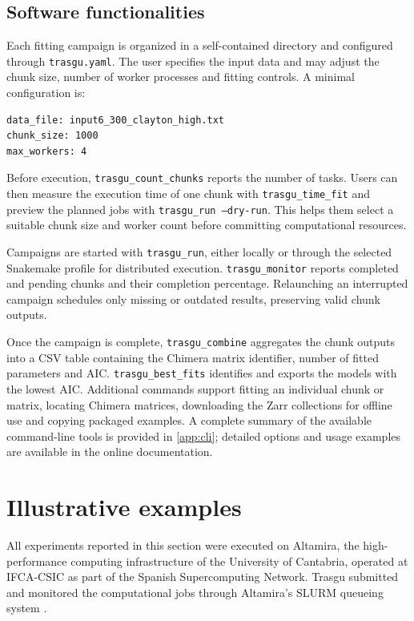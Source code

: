 \documentclass[preprint,12pt, a4paper]{elsarticle}
\begin{document}
\subsection{Software functionalities}

Each fitting campaign is organized in a self-contained directory and configured
through \texttt{trasgu.yaml}. The user specifies the input data and may adjust
the chunk size, number of worker processes and fitting controls. A minimal
configuration is:

\begin{verbatim}
data_file: input6_300_clayton_high.txt
chunk_size: 1000
max_workers: 4
\end{verbatim}

Before execution, \texttt{trasgu\_count\_chunks} reports the number of tasks.
Users can then measure the execution time of one chunk with
\texttt{trasgu\_time\_fit} and preview the planned jobs with
\texttt{trasgu\_run --dry-run}. This helps them select a suitable chunk size
and worker count before committing computational resources.

Campaigns are started with \texttt{trasgu\_run}, either locally or through the
selected Snakemake profile for distributed execution.
\texttt{trasgu\_monitor} reports completed and pending chunks and their
completion percentage. Relaunching an interrupted campaign schedules only
missing or outdated results, preserving valid chunk outputs.

Once the campaign is complete, \texttt{trasgu\_combine} aggregates the chunk
outputs into a CSV table containing the Chimera matrix identifier, number of
fitted parameters and AIC. \texttt{trasgu\_best\_fits} identifies and exports
the models with the lowest AIC. Additional commands support fitting an individual chunk or matrix, locating Chimera matrices, downloading the Zarr collections for offline use and copying packaged examples. A complete summary of the available command-line tools is provided in \ref{app:cli}; detailed options and usage examples are available in the online documentation.


\section{Illustrative examples}

All experiments reported in this section were executed on Altamira, the
high-performance computing infrastructure of the University of Cantabria,
operated at IFCA-CSIC as part of the Spanish Supercomputing Network. Trasgu
submitted and monitored the computational jobs through Altamira's SLURM
queueing system \citep{IFCAAltamira}.
\end{document}
